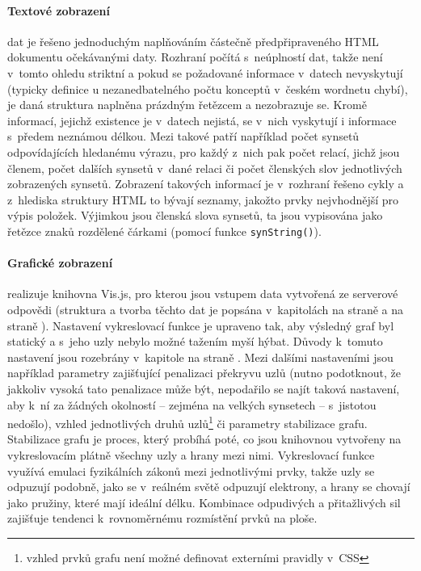 \documentclass[a4paper,11pt,openany,twoside]{book}
\newcommand{\itNameRef}[1]{\textit{\nameref{#1}}}
\begin{document}
				\paragraph{Textové zobrazení} dat je řešeno jednoduchým naplňováním částečně předpřipraveného HTML dokumentu očekávanými daty. Rozhraní počítá s~neúplností dat, takže není v~tomto ohledu striktní a pokud se požadované informace v~datech nevyskytují (typicky definice u nezanedbatelného počtu konceptů v~českém wordnetu chybí), je daná struktura naplněna prázdným řetězcem a nezobrazuje se. Kromě informací, jejichž existence je v~datech nejistá, se v~nich vyskytují i informace s~předem neznámou délkou. Mezi takové patří například počet synsetů odpovídajících hledanému výrazu, pro každý z~nich pak počet relací, jichž jsou členem, počet dalších synsetů v~dané relaci či počet členských slov jednotlivých zobrazených synsetů. Zobrazení takových informací je v~rozhraní řešeno cykly a z~hlediska struktury HTML to bývají seznamy, jakožto prvky nejvhodnější pro výpis položek. Výjimkou jsou členská slova synsetů, ta jsou vypisována jako řetězce znaků rozdělené čárkami (pomocí funkce \texttt{synString()}).

				\paragraph{Grafické zobrazení} realizuje knihovna Vis.js, pro kterou jsou vstupem data vytvořená ze serverové odpovědi (struktura a tvorba těchto dat je popsána v~kapitolách \itNameRef{cha:answerStruct} na straně \pageref{cha:answerStruct} a \itNameRef{cha:zpracovani} na straně \pageref{cha:zpracovani}). Nastavení vykreslovací funkce je upraveno tak, aby výsledný graf byl statický a s~jeho uzly nebylo možné tažením myší hýbat. Důvody k~tomuto nastavení jsou rozebrány v~kapitole \itNameRef{cha:graphui} na straně \pageref{cha:graphui}. Mezi dalšími nastaveními jsou například parametry zajišťující penalizaci překryvu uzlů (nutno podotknout, že jakkoliv vysoká tato penalizace může být, nepodařilo se najít taková nastavení, aby k~ní za žádných okolností -- zejména na velkých synsetech -- s~jistotou nedošlo), vzhled jednotlivých druhů uzlů\footnote{vzhled prvků grafu není možné definovat externími pravidly v~CSS} či parametry stabilizace grafu. Stabilizace grafu je proces, který probíhá poté, co jsou knihovnou vytvořeny na vykreslovacím plátně všechny uzly a hrany mezi nimi. Vykreslovací funkce využívá emulaci fyzikálních zákonů mezi jednotlivými prvky, takže uzly se odpuzují podobně, jako se v~reálném světě odpuzují elektrony, a hrany se chovají jako pružiny, které mají ideální délku. Kombinace odpudivých a přitažlivých sil zajišťuje tendenci k~rovnoměrnému rozmístění prvků na ploše.
\end{document}
